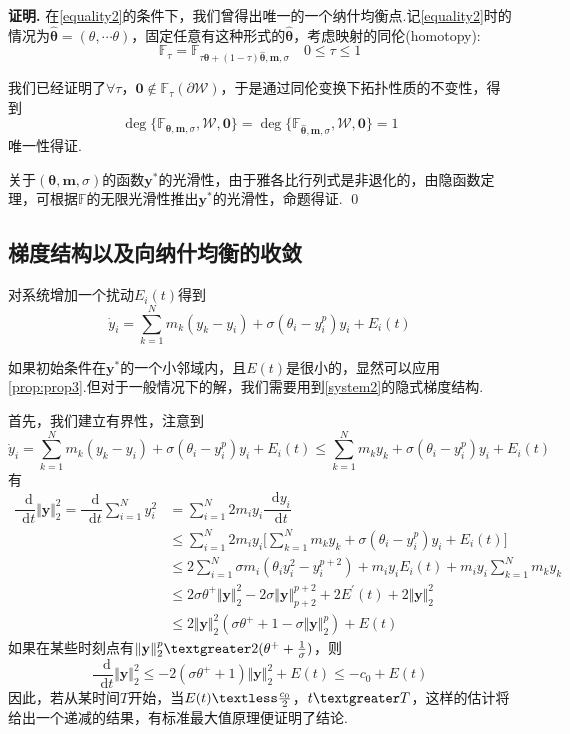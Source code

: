 \documentclass[11pt,a4paper]{article}
\newcommand*{\dif}{\mathop{}\!\mathrm{d}}%
\theoremstyle{definition}
\renewenvironment{proof}{\par\textbf{证明.}\;}{\qed\par}
\begin{document}
\begin{proof}
			在\eqref{equality2}的条件下，我们曾得出唯一的一个纳什均衡点.记\eqref{equality2}时的情况为$\hat{\bm{\theta}}=(\theta,\cdots\theta)$，固定任意有这种形式的$\hat{\bm{\theta}}$，考虑映射的同伦(homotopy):\[ \mathbb{F}_{\tau}=\mathbb{F}_{\tau\bm{\theta}+(1-\tau)\hat{\bm{\theta}},\textbf{m},\sigma}\quad0\leq\tau\leq1 \]
			
			我们已经证明了$\forall\tau$，$\textbf{0}\notin\mathbb{F}_{\tau}(\partial\mathcal{W})$，于是通过同伦变换下拓扑性质的不变性，得到\[ \deg\{\mathbb{F}_{\bm{\theta},\textbf{m},\sigma},\mathcal{W},\textbf{0}\}=\deg\{\mathbb{F}_{\hat{\bm{\theta}},\textbf{m},\sigma},\mathcal{W},\textbf{0}\}=1 \]
			唯一性得证.
			
			关于$(\bm{\theta},\textbf{m},\sigma)$的函数$\textbf{y}^{*}$的光滑性，由于雅各比行列式是非退化的，由隐函数定理，可根据$\mathbb{F}$的无限光滑性推出$\textbf{y}^{*}$的光滑性，命题得证.
	\end{proof}
	\subsection{梯度结构以及向纳什均衡的收敛}
	对系统增加一个扰动$E_{i}(t)$得到
	\begin{equation}\label{system2}
		\dot{y}_{i}=\sum_{k=1}^{N}m_{k}(y_{k}-y_{i})+\sigma(\theta_{i}-y_{i}^{p})y_{i}+E_{i}(t)
	\end{equation}
	
	如果初始条件在$\textbf{y}^{*}$的一个小邻域内，且$E(t)$是很小的，显然可以应用\eqref{prop:prop3}.但对于一般情况下的解，我们需要用到\eqref{system2}的隐式梯度结构.
	
	首先，我们建立有界性，注意到\[ 	\dot{y}_{i}=\sum_{k=1}^{N}m_{k}(y_{k}-y_{i})+\sigma(\theta_{i}-y_{i}^{p})y_{i}+E_{i}(t)\leq\sum_{k=1}^{N}m_{k}y_{k}+\sigma(\theta_{i}-y_{i}^{p})y_{i}+E_{i}(t) \]有
	\begin{align*}
		\dfrac{\dif}{\dif t}\Vert\textbf{y}\Vert_{2}^{2}=\dfrac{\dif}{\dif t}\sum_{i=1}^{N}y_{i}^{2}
		&=\sum_{i=1}^{N}2m_{i}y_{i}\dfrac{\dif y_{i}}{\dif t}\\
		&\leq\sum_{i=1}^{N}2m_{i}y_{i}\Bigg[\sum_{k=1}^{N}m_{k}y_{k}+\sigma(\theta_{i}-y_{i}^{p})y_{i}+E_{i}(t)\Bigg]\\
		&\leq2\sum_{i=1}^{N}\sigma m_{i}(\theta_{i}y_{i}^{2}-y_{i}^{p+2})+m_{i}y_{i}E_{i}(t)+m_{i}y_{i}\sum_{k=1}^{N}m_{k}y_{k}\\
		&\leq2\sigma\theta^{+}\Vert\textbf{y}\Vert_{2}^{2}-2\sigma\Vert\textbf{y}\Vert_{p+2}^{p+2}+2E^{'}(t)+2\Vert\textbf{y}\Vert_{2}^{2}\\
		&\leq2\Vert\textbf{y}\Vert_{2}^{2}(\sigma\theta^{+}+1-\sigma\Vert\textbf{y}\Vert_{2}^{p})+E(t)
	\end{align*}
	如果在某些时刻点有$\Vert\textbf{y}\Vert_{2}^{p}\textgreater2(\theta^{+}+\frac{1}{\sigma})$，则\[ \dfrac{\dif}{\dif t}\Vert\textbf{y}\Vert_{2}^{2}\leq-2(\sigma\theta^{+}+1)\Vert\textbf{y}\Vert_{2}^{2}+E(t)\leq-c_{0}+E(t) \]
	因此，若从某时间$T$开始，当$E(t)\textless\frac{c_{0}}{2}$，$t\textgreater T$，这样的估计将给出一个递减的结果，有标准最大值原理便证明了结论.
	
\end{document}
